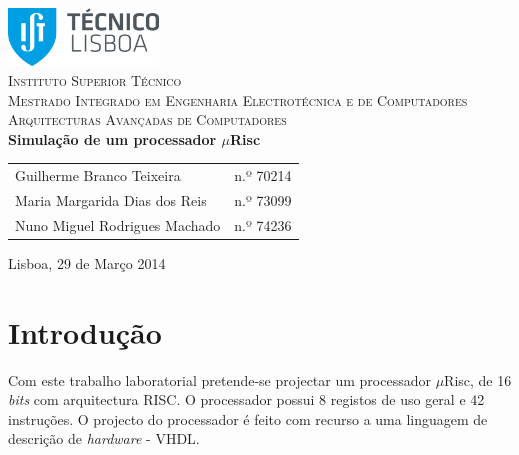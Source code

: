 \documentclass[11pt]{article}
\numberwithin{equation}{section}
\begin{document}
\begin{titlepage}
\begin{center}

\hfill \break
\hfill \break

\includegraphics[width=0.3\textwidth]{./logo}~\\[1cm]

\textsc{\LARGE Instituto Superior Técnico}\\[0.25cm]
\textsc{\Large Mestrado Integrado em Engenharia Electrotécnica e de Computadores}\\[1.8cm]
\textsc{\huge Arquitecturas Avançadas de Computadores}\\[0.25cm]

{\huge \bfseries Simulação de um processador $\mu$Risc\\[1.2cm]}

\begin{tabular}{ l l }
Guilherme Branco Teixeira & \hspace{2mm} n.º 70214 \\ 
Maria Margarida Dias dos Reis & \hspace{2mm} n.º 73099 \\
Nuno Miguel Rodrigues Machado & \hspace{2mm} n.º 74236 
\end{tabular}

\vfill

{\large Lisboa, 29 de Março 2014} 

\end{center}
\end{titlepage}

\clearpage

\tableofcontents
\pagebreak

\clearpage
{}

\section{Introdução}

Com este trabalho laboratorial pretende-se projectar um processador $\mu$Risc, de 16 \textit{bits} com arquitectura RISC. O processador possui 8 registos de uso geral e 42 instruções. O projecto do processador é feito com recurso a uma linguagem de descrição de \textit{hardware} - VHDL.
\end{document}
